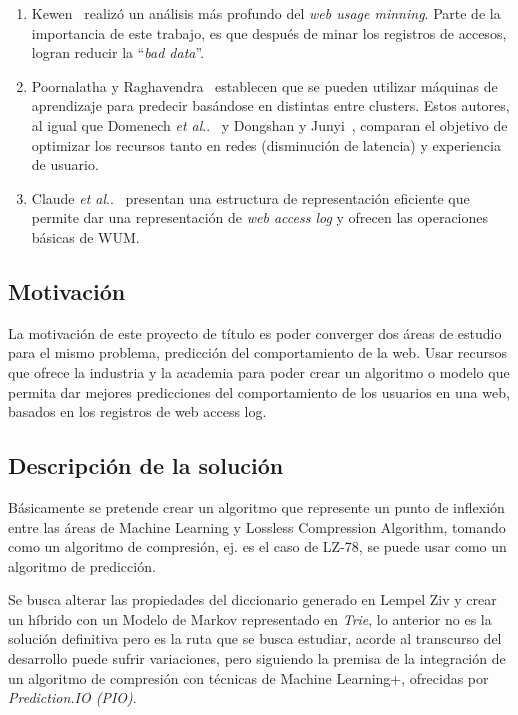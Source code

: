 \documentclass{udparticle}
\makeatletter
\DeclareRobustCommand\onedot{\futurelet\@let@token\@onedot}
\newcommand\@onedot{\ifx\@let@token.\else.\null\fi\xspace}
\newcommand\etal{\emph{et al}\onedot}
\makeatother
\begin{document}
\begin{enumerate}
  \item Kewen~\cite{kewen2012} realizó un análisis más profundo del \emph{web usage minning}.
  Parte de la importancia de este trabajo, es que después de minar los registros de accesos, logran reducir la ``\emph{bad data}''.

  \item Poornalatha y Raghavendra~\cite{Poornalatha2012} establecen que se pueden utilizar máquinas de aprendizaje para predecir basándose en distintas entre clusters. Estos autores, al igual que Domenech \etal~\cite{Domenech2006} y Dongshan y Junyi~\cite{Dongshan2002}, comparan el objetivo de optimizar los recursos tanto en redes (disminución de latencia) y experiencia de usuario.

  \item Claude \etal~\cite{Claude2014} presentan una estructura de representación eficiente que permite dar una representación de \emph{web access log} y ofrecen las operaciones básicas de WUM.
\end{enumerate}


\subsection{Motivación}

La motivación de este proyecto de título es poder converger dos áreas de estudio para el mismo problema, predicción del comportamiento de la web.
Usar recursos que ofrece la industria y la academia para poder crear un algoritmo o modelo que permita dar mejores predicciones del comportamiento de los usuarios en una web, basados en los registros de web access log.


\subsection{Descripción de la solución }
Básicamente se pretende crear un algoritmo que represente un punto de inflexión entre las áreas de Machine Learning y Lossless Compression Algorithm, tomando como un algoritmo de compresión, ej. es el caso de LZ-78, se puede usar como un algoritmo de predicción.

Se busca alterar las propiedades del diccionario generado en Lempel Ziv y crear un híbrido con un Modelo de Markov representado en \emph{Trie}, lo anterior no es la solución definitiva pero es la ruta que se busca estudiar, acorde al transcurso del desarrollo puede sufrir variaciones, pero siguiendo la premisa de la integración de un algoritmo de compresión con técnicas de Machine Learning+, ofrecidas por \textit{Prediction.IO (PIO)}.
\end{document}
